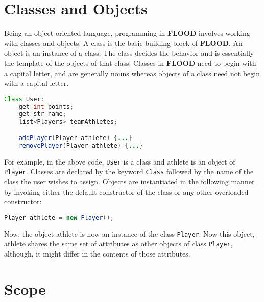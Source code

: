 \documentclass[12pt]{report}
\begin{document}
\section{Classes and Objects}

\begin{doublespace}
Being an object oriented language, programming in \textbf{FLOOD} involves working with classes and objects. A class is the basic building block of \textbf{FLOOD}. An object is an instance of a class. The class decides the behavior and is essentially the template of the objects of that class. Classes in \textbf{FLOOD} need to begin with a capital letter, and are generally nouns whereas objects of a class need not begin with a capital letter. 
\end{doublespace}

\begin{lstlisting}[language=Java,label=some-code,caption=Typical definition of a class in FLOOD]
Class User:
	get int points;
	get str name;
	list<Players> teamAthletes;

	addPlayer(Player athlete) {...}
	removePlayer(Player athlete) {...}
\end{lstlisting}

\begin{doublespace}
For example, in the above code, \texttt{User} is a class and athlete is an object of \texttt{Player}.  Classes are declared by the keyword \texttt{Class} followed by the name of the class the user wishes to assign. Objects are instantiated in the following manner by invoking either the default constructor of the class or any other overloaded constructor:
\end{doublespace}

\begin{lstlisting}[language=Java,label=some-code,caption=Object instatiantion]
Player athlete = new Player();
\end{lstlisting}

\begin{doublespace}
Now, the object athlete is now an instance of the class \texttt{Player}.  Now this object, athlete shares the same set of attributes as other objects of class \texttt{Player}, although, it might differ in the contents of those attributes.
\end{doublespace}

\section{Scope}
\end{document}
